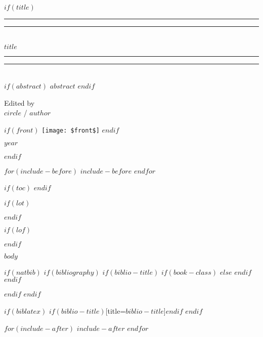 \documentclass[
$if(fontsize)$
  $fontsize$,
$endif$
$if(lang)$
  $lang$,
$endif$
$if(papersize)$
  $papersize$,
$endif$
$for(classoption)$
  $classoption$$sep$,
$endfor$
]{$documentclass$}
\providecommand*{\titleGP}{
\begingroup
\centering %
\vspace*{\baselineskip} %

\rule{\textwidth}{1.6pt}\vspace*{-\baselineskip}\vspace*{2pt} %
\rule{\textwidth}{0.4pt}\\[\baselineskip] %

{\LARGE $title$} \leavevmode\\[0.2\baselineskip] %

\rule{\textwidth}{0.4pt}\vspace*{-\baselineskip}\vspace{3.2pt} %
\rule{\textwidth}{1.6pt}\\[\baselineskip] %

\scshape %
$if(abstract)$
$abstract$
$endif$
\vspace*{2\baselineskip} %

Edited by  \leavevmode\\[\baselineskip]
{\Large $circle$ / $author$} %

$if(front)$
\vfill %
\texttt{[image: \$front\$]}
$endif$
\vfill* %

{\scshape }{\large $year$} \\[0.3\baselineskip] %
\endgroup
}
\newcommand\blankpage{%
    \null
    \thispagestyle{empty}%
    \addtocounter{page}{-1}%
    \newpage}
\begin{document}
$if(title)$
\titleGP
\thispagestyle{empty}
\blankpage
\afterpage{\blankpage}
$endif$

$for(include-before)$
$include-before$
$endfor$

$if(toc)$
\break
\break
{
\hypersetup{linkcolor=$if(toccolor)$$toccolor$$else$black$endif$}
\setcounter{tocdepth}{$toc-depth$}
\tableofcontents
}
$endif$

$if(lot)$
\listoftables
$endif$

$if(lof)$
\listoffigures
$endif$

$body$

$if(natbib)$
  $if(bibliography)$
    $if(biblio-title)$
      $if(book-class)$
        \renewcommand\bibname{$biblio-title$}
      $else$
        \renewcommand\refname{$biblio-title$}
      $endif$
    $endif$
      
  $endif$
$endif$

$if(biblatex)$
\printbibliography$if(biblio-title)$[title=$biblio-title$]$endif$
$endif$


$for(include-after)$
$include-after$
$endfor$


\end{document}
